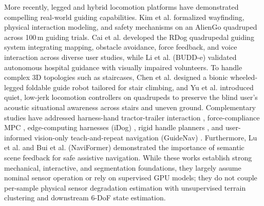 \documentclass[11pt, a4paper]{article}
\begin{document}
More recently, legged and hybrid locomotion platforms \cite{bledt2018cheetah} have demonstrated compelling real-world guiding capabilities. Kim et al. \cite{kim2023transforming} formalized wayfinding, physical interaction modeling, and safety mechanisms on an AlienGo quadruped across 100\,m guiding trials. Cai et al. \cite{cai2024navigating} developed the RDog quadrupedal guiding system integrating mapping, obstacle avoidance, force feedback, and voice interaction across diverse user studies, while Li et al. (BUDD-e) \cite{li2026budd} validated autonomous hospital guidance with visually impaired volunteers. To handle complex 3D topologies such as staircases, Chen et al. \cite{chen2025bionic} designed a bionic wheeled-legged foldable guide robot tailored for stair climbing, and Yu et al. \cite{yu2025human, yu2026human} introduced quiet, low-jerk locomotion controllers on quadrupeds to preserve the blind user's acoustic situational awareness across stairs and uneven ground. Complementary studies have addressed harness-hand tractor-trailer interaction \cite{akhdan2024guiding}, force-compliance MPC \cite{fan2024force, fan2025force}, edge-computing harnesses (iDog) \cite{chen2024idog}, rigid handle planners \cite{hwang2022system, hwang2023system}, and user-informed vision-only teach-and-repeat navigation (GuideNav) \cite{hwang2026guidenav}. Furthermore, Lu et al. \cite{lu2021assistive} and Bui et al. (NaviFormer) \cite{bui2026naviformer} demonstrated the importance of semantic scene feedback for safe assistive navigation. While these works establish strong mechanical, interactive, and segmentation foundations, they largely assume nominal sensor operation or rely on supervised GPU models; they do not couple per-sample physical sensor degradation estimation with unsupervised terrain clustering and downstream 6-DoF state estimation.
\end{document}
